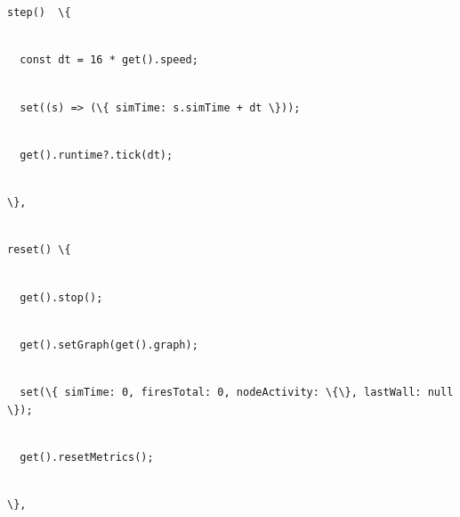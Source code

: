 \documentclass[
]{article}
\newcommand{\passthrough}[1]{#1}
\begin{document}
\passthrough{\lstinline!step()!}\passthrough{\lstinline!  !}\passthrough{\lstinline!\{!}\strut \\
\passthrough{\lstinline!  !}\passthrough{\lstinline!const!}\passthrough{\lstinline! !}\passthrough{\lstinline!dt!}\passthrough{\lstinline! !}\passthrough{\lstinline!=!}\passthrough{\lstinline! !}\passthrough{\lstinline!16!}\passthrough{\lstinline! !}\passthrough{\lstinline!*!}\passthrough{\lstinline! !}\passthrough{\lstinline!get().speed;!}\strut \\
\passthrough{\lstinline!  !}\passthrough{\lstinline!set((s)!}\passthrough{\lstinline! !}\passthrough{\lstinline!=>!}\passthrough{\lstinline! !}\passthrough{\lstinline!(\{!}\passthrough{\lstinline! !}\passthrough{\lstinline!simTime!}\passthrough{\lstinline!:!}\passthrough{\lstinline! !}\passthrough{\lstinline!s.simTime!}\passthrough{\lstinline! !}\passthrough{\lstinline!+!}\passthrough{\lstinline! !}\passthrough{\lstinline!dt!}\passthrough{\lstinline! !}\passthrough{\lstinline!\}));!}\strut \\
\passthrough{\lstinline!  !}\passthrough{\lstinline!get().!}\passthrough{\lstinline!runtime?.tick!}\passthrough{\lstinline!(dt);!}\strut \\
\passthrough{\lstinline!\},!}\strut \\
\passthrough{\lstinline!reset()!}\passthrough{\lstinline! !}\passthrough{\lstinline!\{!}\strut \\
\passthrough{\lstinline!  !}\passthrough{\lstinline!get().stop();!}\strut \\
\passthrough{\lstinline!  !}\passthrough{\lstinline!get().!}\passthrough{\lstinline!setGraph!}\passthrough{\lstinline!(get().graph);!}\strut \\
\passthrough{\lstinline!  !}\passthrough{\lstinline!set(\{!}\passthrough{\lstinline! !}\passthrough{\lstinline!simTime!}\passthrough{\lstinline!:!}\passthrough{\lstinline! !}\passthrough{\lstinline!0,!}\passthrough{\lstinline! !}\passthrough{\lstinline!firesTotal!}\passthrough{\lstinline!:!}\passthrough{\lstinline! !}\passthrough{\lstinline!0,!}\passthrough{\lstinline! !}\passthrough{\lstinline!nodeActivity!}\passthrough{\lstinline!:!}\passthrough{\lstinline! !}\passthrough{\lstinline!\{\},!}\passthrough{\lstinline! !}\passthrough{\lstinline!lastWall!}\passthrough{\lstinline!:!}\passthrough{\lstinline! !}\passthrough{\lstinline!null!}\passthrough{\lstinline! !}\passthrough{\lstinline!\});!}\strut \\
\passthrough{\lstinline!  !}\passthrough{\lstinline!get().!}\passthrough{\lstinline!resetMetrics!}\passthrough{\lstinline!();!}\strut \\
\passthrough{\lstinline!\},!}
\end{document}
